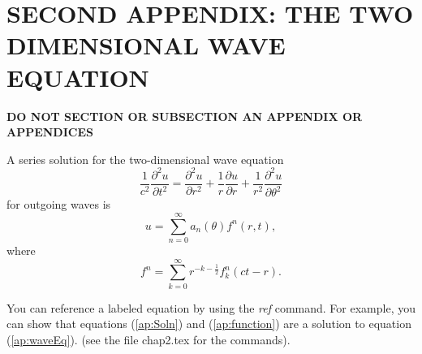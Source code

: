 \chapter{SECOND APPENDIX: THE TWO DIMENSIONAL WAVE EQUATION} \label{ap:2DWaveEquation}

{\bf  DO NOT SECTION OR SUBSECTION AN APPENDIX OR APPENDICES}

A series solution for the two-dimensional wave equation
\begin{equation}
\frac{1}{c^{2}}\frac{\partial^{2}u}{\partial t^{2}} = \frac{\partial^{2}u}{\partial r^{2}} + %
        \frac{1}{r}\frac{\partial u}{\partial r} + \frac{1}{r^{2}}\frac{\partial^{2}u}%
        {\partial\theta^{2}}                                                                 \label{ap:waveEq}
\end{equation}
for outgoing waves is
\begin{equation}
u = \sum_{n=0}^{\infty}a_{n}(\theta)f^{n}(r,t),                                              \label{ap:Soln}
\end{equation}
where
\begin{equation}
f^{n} = \sum_{k=0}^{\infty}r^{-k-\frac{1}{2}}f_{k}^{n}(ct-r).                                \label{ap:function}
\end{equation} %

You can reference a labeled equation by using the \textit{ref}
command.  For example, you can show that equations (\ref{ap:Soln}) and
(\ref{ap:function}) are a solution to equation (\ref{ap:waveEq}).
(see the file chap2.tex for the commands).



